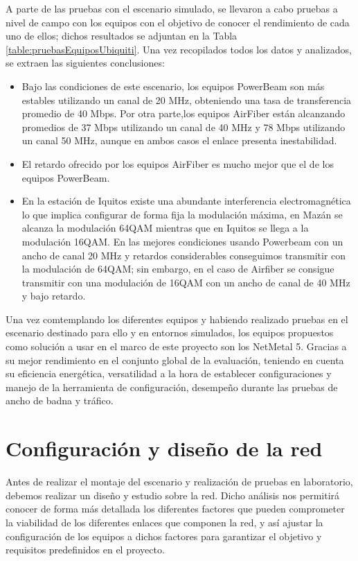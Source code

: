 A parte de las pruebas con el escenario  simulado, se llevaron a cabo pruebas a nivel de campo con los equipos con el objetivo de conocer el rendimiento de cada uno de ellos; dichos resultados se adjuntan en la Tabla \ref{table:pruebasEquiposUbiquiti}. Una vez recopilados todos los datos y analizados, se extraen las siguientes conclusiones:

\begin{itemize}
    \item Bajo las condiciones de este escenario, los equipos PowerBeam son más estables utilizando un canal de 20 MHz, obteniendo una tasa de transferencia promedio de 40 Mbps. Por otra parte,los equipos AirFiber están alcanzando promedios de 37 Mbps utilizando un canal de 40 MHz y 78 Mbps utilizando un canal 50 MHz, aunque en ambos casos el enlace presenta inestabilidad.
    \item El retardo ofrecido por los equipos AirFiber es mucho mejor que el de los equipos PowerBeam.
    \item En la estación de Iquitos existe una abundante interferencia electromagnética lo que implica configurar de forma fija la modulación máxima, en Mazán se alcanza la modulación 64QAM mientras que en Iquitos se llega a la modulación 16QAM. En las mejores condiciones usando Powerbeam con un ancho de canal 20 MHz y retardos considerables conseguimos transmitir con la modulación de 64QAM; sin embargo, en el caso de Airfiber se consigue transmitir con una modulación de 16QAM con un ancho de canal de 40 MHz y bajo retardo.
\end{itemize}

Una vez comtemplando los diferentes equipos y habiendo realizado pruebas en el escenario destinado para ello y en entornos simulados, los equipos propuestos como solución a usar en el marco de este proyecto son los NetMetal 5. Gracias a su mejor rendimiento en el conjunto global de la evaluación, teniendo en cuenta su eficiencia energética, versatilidad a la hora de establecer configuraciones y manejo de la herramienta de configuración, desempeño durante las pruebas de ancho de badna y tráfico.

\section{Configuración y diseño de la red}
Antes de realizar el montaje del escenario y realización de pruebas en laboratorio, debemos realizar un diseño y estudio sobre la red. Dicho análisis nos permitirá conocer de forma más detallada los diferentes factores que pueden comprometer la viabilidad de los diferentes enlaces que componen la red, y así ajustar la configuración de los equipos a dichos factores para garantizar el objetivo y requisitos predefinidos en el proyecto.\\


